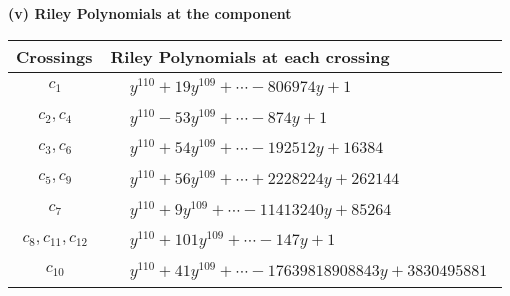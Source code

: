 \documentclass[1p]{elsarticle_modified}
\theoremstyle{definition}
\begin{document}
\newpage\renewcommand{\arraystretch}{1}
\flushleft \textbf{(v) Riley Polynomials at the component}\newline \\
\begin{tabular}{m{50pt}|m{274pt}}
Crossings & \hspace{64pt}Riley Polynomials at each crossing \\
\hline $$\begin{aligned}c_{1}\end{aligned}$$&$\begin{aligned}
&y^{110}+19 y^{109}+\cdots-806974 y+1
\end{aligned}$\\
\hline $$\begin{aligned}c_{2},c_{4}\end{aligned}$$&$\begin{aligned}
&y^{110}-53 y^{109}+\cdots-874 y+1
\end{aligned}$\\
\hline $$\begin{aligned}c_{3},c_{6}\end{aligned}$$&$\begin{aligned}
&y^{110}+54 y^{109}+\cdots-192512 y+16384
\end{aligned}$\\
\hline $$\begin{aligned}c_{5},c_{9}\end{aligned}$$&$\begin{aligned}
&y^{110}+56 y^{109}+\cdots+2228224 y+262144
\end{aligned}$\\
\hline $$\begin{aligned}c_{7}\end{aligned}$$&$\begin{aligned}
&y^{110}+9 y^{109}+\cdots-11413240 y+85264
\end{aligned}$\\
\hline $$\begin{aligned}c_{8},c_{11},c_{12}\end{aligned}$$&$\begin{aligned}
&y^{110}+101 y^{109}+\cdots-147 y+1
\end{aligned}$\\
\hline $$\begin{aligned}c_{10}\end{aligned}$$&$\begin{aligned}
&y^{110}+41 y^{109}+\cdots-17639818908843 y+3830495881
\end{aligned}$\\
\hline
\end{tabular}\\~\\
\end{document}
